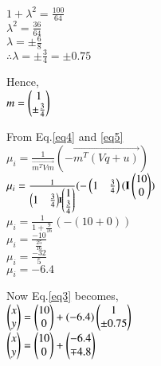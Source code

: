\documentclass[journal,12pt,twocolumn]{IEEEtran}
\begin{document}
\vspace{0.25cm}
$ 1 + \lambda^2 = \frac{100}{64} $\\
\vspace{0.25cm}
$ \lambda^2 = \frac{36}{64} $ \\
\vspace{0.25cm}
$ \lambda = \pm \frac{6}{8} $ \\
\vspace{0.25cm}
$ \therefore \lambda = \pm \frac{3}{4} = \pm 0.75 $ \\ 
\vspace{0.25cm}
\raggedright
Hence,\\
\vspace{0.25cm}
\centering
$ m = \begin{pmatrix}1 \\ \pm \frac{3}{4}\end{pmatrix} $ \\
\vspace{0.25cm}
\raggedright
From Eq.\eqref{eq4} and \eqref{eq5}\\
\vspace{0.25cm}
\centering
$ \mu_i = \frac{1}{\vec{m^T Vm}} ( - \vec{m^T (Vq + u)})$\\
\vspace{0.25cm}
$ \mu_i = \frac{1}{\begin{pmatrix}1 & \frac{3}{4}\end{pmatrix} \mathbf{I} \begin{pmatrix}1\\\frac{3}{4}\end{pmatrix}} ( - \begin{pmatrix}1&\frac{3}{4}\end{pmatrix} ( \mathbf{I}\begin{pmatrix}10\\0\end{pmatrix})$\\ 
\vspace{0.25cm}
$ \mu_i = \frac{1}{1 + \frac{9}{16}} ( - (10 + 0) )$\\
\vspace{0.25cm}
$ \mu_i = \frac{-10}{\frac{25}{16}}$\\
\vspace{0.25cm}
$ \mu_i = \frac{-32}{5} $ \\
\vspace{0.25cm}
$ \mu_i = -6.4 $\\
\vspace{0.4cm}
\raggedright
Now Eq.\eqref{eq3} becomes,\\
\vspace{0.25cm}
\centering
$ \begin{pmatrix}x \\ y\end{pmatrix} = \begin{pmatrix}10\\0\end{pmatrix} + (-6.4)  \begin{pmatrix}1 \\ \pm 0.75\end{pmatrix} $ \\
\vspace{0.25cm}
$ \begin{pmatrix}x \\y \end{pmatrix} = \begin{pmatrix}10\\0\end{pmatrix} + \begin{pmatrix}-6.4 \\ \mp 4.8\end{pmatrix} $ \\
\end{document}
